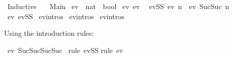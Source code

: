 %
\begin{isabellebody}%
%
%
\isadelimtheory
%
\endisadelimtheory
%
\isatagtheory
{}\isamarkupfalse%
\ Inductive\isanewline
\ \ \ Main\isanewline
{}%
\endisatagtheory
{\isafoldtheory}%
%
\isadelimtheory
%
\endisadelimtheory
%
\isadelimdocument
%
\endisadelimdocument
%
\isatagdocument
%
\isamarkuptrue%
%
\isamarkuptrue%
%
\endisatagdocument
{\isafolddocument}%
%
\isadelimdocument
%
\endisadelimdocument
{}\isamarkupfalse%
\ ev\ {\isacharcolon}{\kern0pt}{\isacharcolon}{\kern0pt}\ {\isachardoublequoteopen}nat\ {\isasymRightarrow}\ bool{\isachardoublequoteclose}\ \isanewline
ev{}{\isacharcolon}{\kern0pt}\ {\isachardoublequoteopen}ev\ {}{\isachardoublequoteclose}\ {\isacharbar}{\kern0pt}\isanewline
evSS{\isacharcolon}{\kern0pt}\ {\isachardoublequoteopen}ev\ n\ {\isasymLongrightarrow}\ ev\ {\isacharparenleft}{\kern0pt}Suc{\isacharparenleft}{\kern0pt}Suc\ n{\isacharparenright}{\kern0pt}{\isacharparenright}{\kern0pt}{\isachardoublequoteclose}\isanewline
\isanewline
{}\isamarkupfalse%
\ ev{}\ evSS\isanewline
{}\isamarkupfalse%
\ ev{\isachardot}{\kern0pt}intros\isanewline
{}\isamarkupfalse%
\ ev{\isachardot}{\kern0pt}intros{\isacharparenleft}{\kern0pt}{}{\isacharparenright}{\kern0pt}\isanewline
{}\isamarkupfalse%
\ ev{\isachardot}{\kern0pt}intros{\isacharparenleft}{\kern0pt}{}{\isacharparenright}{\kern0pt}\isanewline
\isanewline
{}\isamarkupfalse%
%
\begin{isamarkuptext}%
Using the introduction rules:%
\end{isamarkuptext}\isamarkuptrue%
\isamarkupfalse%
\ {\isachardoublequoteopen}ev\ {\isacharparenleft}{\kern0pt}Suc{\isacharparenleft}{\kern0pt}Suc{\isacharparenleft}{\kern0pt}Suc{\isacharparenleft}{\kern0pt}Suc\ {}{\isacharparenright}{\kern0pt}{\isacharparenright}{\kern0pt}{\isacharparenright}{\kern0pt}{\isacharparenright}{\kern0pt}{\isachardoublequoteclose}\isanewline
%
\isadelimproof
%
\endisadelimproof
%
\isatagproof
{}\isamarkupfalse%
{\isacharparenleft}{\kern0pt}rule\ evSS{\isacharparenright}{\kern0pt}{\isacharplus}{\kern0pt}\isanewline
{}\isamarkupfalse%
{\isacharparenleft}{\kern0pt}rule\ ev{}{\isacharparenright}{\kern0pt}\isanewline

\end{isabellebody}
